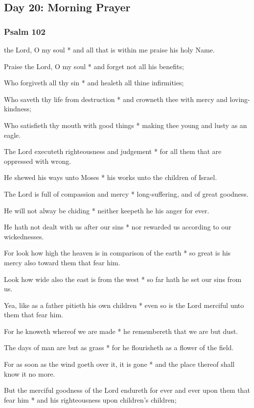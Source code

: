 \subsection{Day 20: Morning Prayer}

\subsubsection{Psalm 102}


 the Lord, O my soul * and all that is within me praise his holy Name.

Praise the Lord, O my soul * and forget not all his benefits;

Who forgiveth all thy sin * and healeth all thine infirmities;

Who saveth thy life from destruction * and crowneth thee with mercy and loving-kindness;

Who satisfieth thy mouth with good things * making thee young and lusty as an eagle.

The Lord executeth righteousness and judgement * for all them that are oppressed with wrong.

He shewed his ways unto Moses * his works unto the children of Israel.

The Lord is full of compassion and mercy * long-suffering, and of great goodness.

He will not alway be chiding * neither keepeth he his anger for ever.

He hath not dealt with us after our sins * nor rewarded us according to our wickednesses.

For look how high the heaven is in comparison of the earth * so great is his mercy also toward them that fear him.

Look how wide also the east is from the west * so far hath he set our sins from us.

Yea, like as a father pitieth his own children * even so is the Lord merciful unto them that fear him.

For he knoweth whereof we are made * he remembereth that we are but dust.

The days of man are but as grass * for he flourisheth as a flower of the field.

For as soon as the wind goeth over it, it is gone * and the place thereof shall know it no more.

But the merciful goodness of the Lord endureth for ever and ever upon them that fear him * and his righteousness upon children's children;

